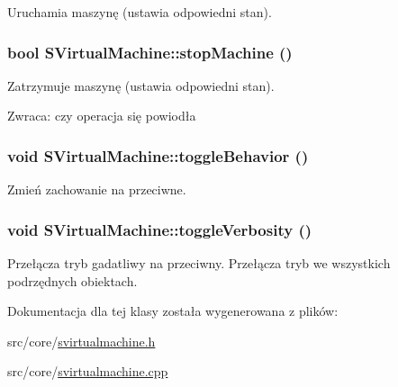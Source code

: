 Uruchamia maszynę (ustawia odpowiedni stan). \hypertarget{classSVirtualMachine_81211b6ef712dbc4a147d7fa86aed440}{
\subsubsection[{stopMachine}]{\setlength{\rightskip}{0pt plus 5cm}bool SVirtualMachine::stopMachine ()}}
\label{classSVirtualMachine_81211b6ef712dbc4a147d7fa86aed440}


Zatrzymuje maszynę (ustawia odpowiedni stan). \begin{Desc}
\item[Zwraca:]czy operacja się powiodła \end{Desc}
\hypertarget{classSVirtualMachine_1d68dbb4416964707c818a550dcb10e9}{
\subsubsection[{toggleBehavior}]{\setlength{\rightskip}{0pt plus 5cm}void SVirtualMachine::toggleBehavior ()}}
\label{classSVirtualMachine_1d68dbb4416964707c818a550dcb10e9}


Zmień zachowanie na przeciwne. \hypertarget{classSVirtualMachine_d099907121223d24b1a599a3518cf3b0}{
\subsubsection[{toggleVerbosity}]{\setlength{\rightskip}{0pt plus 5cm}void SVirtualMachine::toggleVerbosity ()}}
\label{classSVirtualMachine_d099907121223d24b1a599a3518cf3b0}


Przełącza tryb gadatliwy na przeciwny. Przełącza tryb we wszystkich podrzędnych obiektach. 

Dokumentacja dla tej klasy została wygenerowana z plików:\begin{CompactItemize}
\item 
src/core/\hyperlink{svirtualmachine_8h}{svirtualmachine.h}\item 
src/core/\hyperlink{svirtualmachine_8cpp}{svirtualmachine.cpp}\end{CompactItemize}
